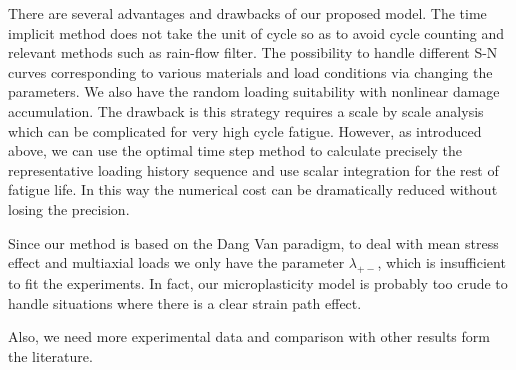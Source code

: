 There are several advantages and drawbacks of our proposed model. The time implicit method does not take the unit of cycle so as to avoid cycle counting and relevant methods such as rain-flow filter. The possibility to handle different S-N curves corresponding to various materials and load conditions via changing the parameters. We also have the random loading suitability with nonlinear damage accumulation. The drawback is this strategy requires a scale by scale analysis which can be complicated for very high cycle fatigue. However, as introduced above, we can use the optimal time step method to calculate precisely the representative loading history sequence and use scalar integration for the rest of fatigue life. In this way the numerical cost can be dramatically reduced without losing the precision.

Since our method is based on the Dang Van paradigm, to deal with mean stress effect and multiaxial loads we only have the parameter $\lambda_{+-}$, which is insufficient to fit the experiments. In fact, our microplasticity model is probably too crude to handle situations where there is  a clear strain path effect.

Also, we need more experimental data and comparison with other results form the literature.









